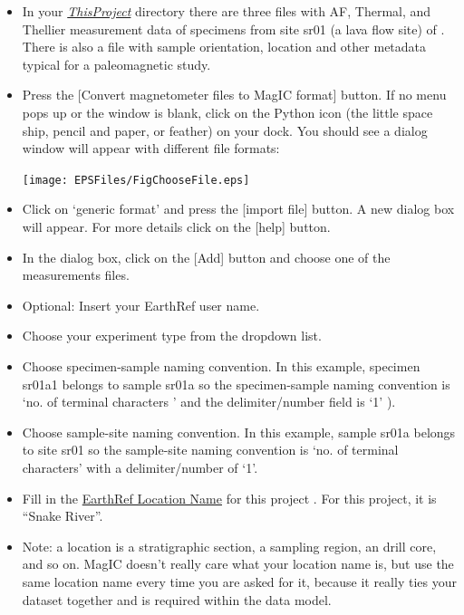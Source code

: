 \documentclass[11pt]{book}
\begin{document}
{\begin{itemize}

\item In your  \href{#Project_Directory}{\it ThisProject} directory  there are three files with AF, Thermal, and Thellier measurement data of specimens from site sr01 (a lava flow site) of \cite{tauxe04b}.  There is also a file with sample orientation, location and other metadata typical for a paleomagnetic study.
\item Press the [Convert magnetometer files to MagIC format] button. If no menu pops up or the window is blank, click on the Python icon  (the little space ship, pencil and paper, or feather) on your dock. You should see a dialog window will appear with different file formats:

\texttt{[image: EPSFiles/FigChooseFile.eps]}

\item  Click on  `generic format'  and press the  [import file] button.  A new dialog box will appear. For more details click on the [help] button.
\item  In the dialog box, click on the [Add] button and choose one of the measurements files.
\item  Optional: Insert your EarthRef user name.
\item Choose your experiment type from the dropdown list.

\item Choose specimen-sample naming convention.  In this example, specimen sr01a1 belongs to sample sr01a so the specimen-sample naming convention is  `no. of terminal characters ' and the delimiter/number field is `1' ).
\item Choose sample-site naming convention.  In this example, sample sr01a belongs to site sr01 so the sample-site naming convention is  `no. of terminal characters' with a delimiter/number of  `1'.
\item  Fill in the \href{#MagICDatabase}{EarthRef Location Name}  for this project .  For this project, it is ``Snake River''.

\item Note:  a location is a stratigraphic section,  a sampling region,  an drill core, and so on.  MagIC doesn't really care what your location name is, but use the same location name every time you are asked for it, because it really ties your dataset together and is required within the data model.


\end{itemize}}
\end{document}
